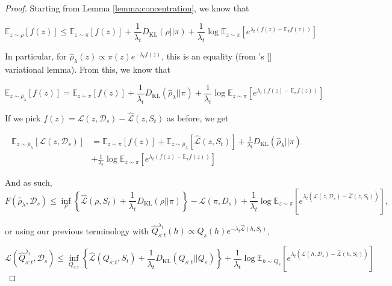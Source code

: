 \documentclass{article}
\theoremstyle{plain}
\theoremstyle{definition}
\theoremstyle{remark}
\begin{document}
\begin{proof}
Starting from Lemma \ref{lemma:concentration}, we know that 

$$\mathbb{E}_{z\sim \rho}\left [f(z) \right ]\leq \mathbb{E}_{z\sim \pi}\left [f(z) \right ]+ \frac{1}{\lambda_t}D_{\mathrm{KL}}(\rho||\pi)+ \frac{1}{\lambda_t}\log\mathbb{E}_{z\sim \pi}\left [e^{\lambda_t(f(z)-\mathbb{E}_\pi f(z))} \right ]$$

In particular, for $\hat{\rho}_\lambda(z)\propto \pi(z) e^{-\lambda_t f(z) }$, this is an equality (from \citeauthor{donsker1975large}'s [\citeyear{donsker1975large}] variational lemma).
From this, we know that

\begin{equation}
\mathbb{E}_{z\sim \hat{\rho}_\lambda}\left [f(z) \right ]= \mathbb{E}_{z\sim \pi}\left [f(z) \right ]+ \frac{1}{\lambda_t}D_{\mathrm{KL}}(\hat{\rho}_\lambda||\pi)+ \frac{1}{\lambda_t}\log\mathbb{E}_{z\sim \pi}\left [e^{\lambda_t(f(z)-\mathbb{E}_\pi f(z))} \right ]
\end{equation}

If we pick $f(z)=\mathcal{L}(z,\mathcal{D}_s)-\hat{\mathcal{L}}(z,S_t)$ as before, we get

\begin{equation*} 
\begin{split}
\mathbb{E}_{z\sim \hat{\rho}_\lambda}\left [\mathcal{L}(z,\mathcal{D}_s) \right ]&= \mathbb{E}_{z\sim \pi}\left [f(z) \right ]+\mathbb{E}_{z\sim \hat{\rho}_\lambda}\left [\hat{\mathcal{L}}(z,S_t) \right ]+ \frac{1}{\lambda_t}D_{\mathrm{KL}}(\hat{\rho}_\lambda||\pi)\\&+ \frac{1}{\lambda_t}\log\mathbb{E}_{z\sim \pi}\left [e^{\lambda_t(f(z)-\mathbb{E}_\pi f(z))} \right ]
\end{split}
\end{equation*}

And as such,
$$F( \hat{\rho}_\lambda,\mathcal{D}_s)\leq \inf_{\rho}\left \{ \hat{\mathcal{L}}(\rho,S_t) + \frac{1}{\lambda_t}D_{\mathrm{KL}}(\rho||\pi)  \right \}-\mathcal{L}(\pi,D_s)+\frac{1}{\lambda_t}\log\mathbb{E}_{z\sim \pi}\left [e^{\lambda_t(\mathcal{L}(z,\mathcal{D}_s)-\hat{\mathcal{L}}(z,S_t))} \right ],$$

or using our previous terminology with $\hat{Q}^{\lambda_t}_{s:t}(h)\propto Q_s(h)e^{-\lambda_t\hat{\mathcal{L}}(h,S_t)}$, 

$$\mathcal{L}( \hat{Q}^{\lambda_t}_{s:t},\mathcal{D}_s)\leq \inf_{Q_{s:t}}\left \{ \hat{\mathcal{L}}(Q_{s:t},S_t) + \frac{1}{\lambda_t}D_{\mathrm{KL}}(Q_{s:t}||Q_{s}) \right \}+\frac{1}{\lambda_t}\log\mathbb{E}_{h\sim Q_s}\left [e^{\lambda_t(\mathcal{L}(h,\mathcal{D}_s)-\hat{\mathcal{L}}(h,S_t))} \right ]$$


\end{proof}
\end{document}
